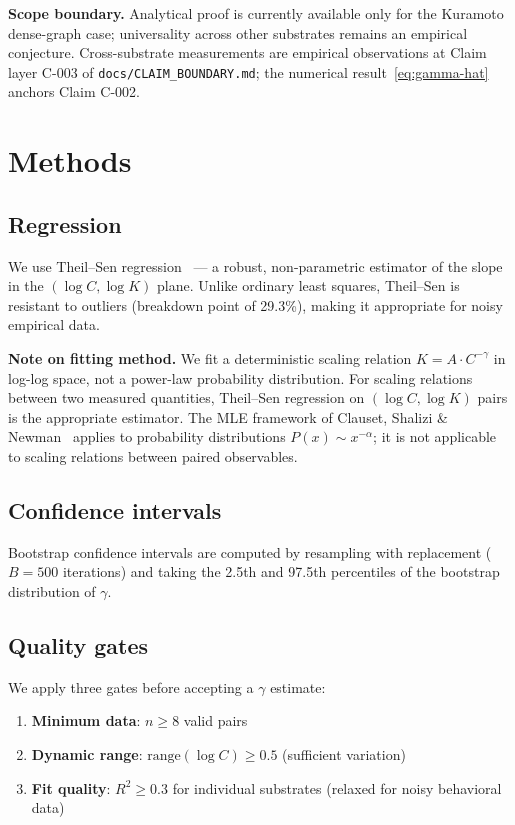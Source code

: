 \documentclass[11pt,a4paper,twocolumn]{article}
\begin{document}
\medskip
\noindent\textbf{Scope boundary.}
Analytical proof is currently available only for the Kuramoto dense-graph case; universality across other substrates remains an empirical conjecture. Cross-substrate measurements are empirical observations at Claim layer C-003 of \texttt{docs/CLAIM\_BOUNDARY.md}; the numerical result~\eqref{eq:gamma-hat} anchors Claim C-002.

\section{Methods}

\subsection{Regression}

We use Theil--Sen regression~\cite{theil1950} --- a robust, non-parametric estimator of the slope in the $(\log C, \log K)$ plane. Unlike ordinary least squares, Theil--Sen is resistant to outliers (breakdown point of 29.3\%), making it appropriate for noisy empirical data.

\textbf{Note on fitting method.} We fit a deterministic scaling relation $K = A \cdot C^{-\gamma}$ in log-log space, not a power-law probability distribution. For scaling relations between two measured quantities, Theil--Sen regression on $(\log C, \log K)$ pairs is the appropriate estimator. The MLE framework of Clauset, Shalizi \& Newman~\cite{clauset2009} applies to probability distributions $P(x) \sim x^{-\alpha}$; it is not applicable to scaling relations between paired observables.

\subsection{Confidence intervals}

Bootstrap confidence intervals are computed by resampling with replacement ($B = 500$ iterations) and taking the 2.5th and 97.5th percentiles of the bootstrap distribution of $\gamma$.

\subsection{Quality gates}

We apply three gates before accepting a $\gamma$ estimate:
\begin{enumerate}
\item \textbf{Minimum data}: $n \geq 8$ valid pairs
\item \textbf{Dynamic range}: $\text{range}(\log C) \geq 0.5$ (sufficient variation)
\item \textbf{Fit quality}: $R^2 \geq 0.3$ for individual substrates (relaxed for noisy behavioral data)
\end{enumerate}
\end{document}
